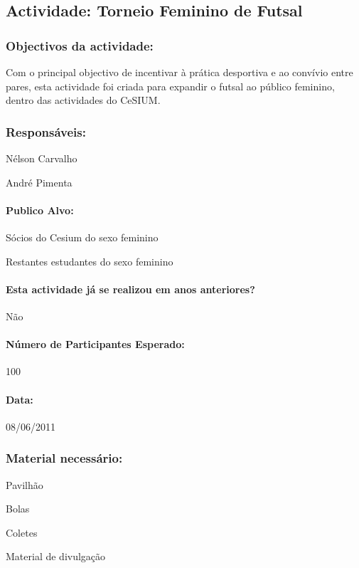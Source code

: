 \subsection{Actividade: Torneio Feminino de Futsal} 

\subsubsection*{Objectivos da actividade:}
Com o principal objectivo de incentivar à prática desportiva e ao convívio entre pares, esta actividade foi criada para expandir o futsal ao público feminino, dentro das actividades do CeSIUM.
\subsubsection*{Responsáveis:}
\begin{itemizedash}
	\item{Nélson Carvalho}
	\item{André Pimenta}
\end{itemizedash}

\paragraph{Publico Alvo: }
\begin{itemizedash}
     \item{Sócios do Cesium do sexo feminino}
     \item{Restantes estudantes do sexo feminino}
\end{itemizedash}

\paragraph{Esta actividade já se realizou em anos anteriores?}
Não

\paragraph{Número de Participantes Esperado:}
100

\paragraph{Data:} 08/06/2011

\subsubsection*{Material necessário:}
\begin{itemizedash}
	\item{Pavilhão}
	\item{Bolas}
	\item{Coletes}
	\item{Material de divulgação}
\end{itemizedash}

